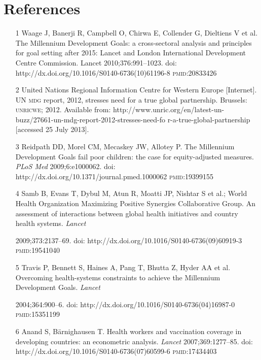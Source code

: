 \documentclass{article}
\begin{document}
\section*{References}
\begin{itemize}

\item[1] Waage J, Banerji R, Campbell O, Chirwa E, Collender G, Dieltiens V et
al. The
Millennium Development Goals: a cross-sectoral analysis and principles for goal
setting after 2015:
Lancet and London International Development Centre Commission. Lancet
2010;376:991–1023. doi:
http://dx.doi.org/10.1016/S0140-6736(10)61196-8 \textsc{pmid}:20833426

\item[2] United Nations Regional Information Centre for Western Europe
[Internet]. UN \textsc{mdg}
report, 2012, stresses need for a true global partnership. Brussels: \textsc{unricwe};
2012. Available from:
http://www.unric.org/en/latest-un-buzz/27661-un-mdg-report-2012-stresses-need-fo
r-a-true-global-partnership
[accessed 25 July 2013].

\item[3] Reidpath DD, Morel CM, Mecaskey JW, Allotey P. The Millennium
Development Goals fail
poor children: the case for equity-adjusted measures. \textit{PLoS Med}
2009;6:e1000062.
doi: http://dx.doi.org/10.1371/journal.pmed.1000062 \textsc{pmid}:19399155

\item[4] Samb B, Evans T, Dybul M, Atun R, Moatti JP, Nishtar S et al.; World
Health
Organization Maximizing Positive Synergies Collaborative Group. An assessment of
interactions
between global health initiatives and country health systems. \textit{Lancet}

2009;373:2137–69. doi: http://dx.doi.org/10.1016/S0140-6736(09)60919-3
\textsc{pmid}:19541040

\item[5] Travis P, Bennett S, Haines A, Pang T, Bhutta Z, Hyder AA et al.
Overcoming
health-systems constraints to achieve the Millennium Development Goals.
\textit{Lancet}

2004;364:900–6. doi: http://dx.doi.org/10.1016/S0140-6736(04)16987-0
\textsc{pmid}:15351199

\item[6] Anand S, Bärnighausen T. Health workers and vaccination coverage in
developing
countries: an econometric analysis. \textit{Lancet}
2007;369:1277–85. doi:
http://dx.doi.org/10.1016/S0140-6736(07)60599-6 \textsc{pmid}:17434403


\end{itemize}
\end{document}
